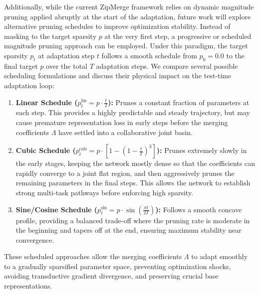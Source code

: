 Additionally, while the current ZipMerge framework relies on dynamic magnitude pruning applied abruptly at the start of the adaptation, future work will explore alternative pruning schedules to improve optimization stability. Instead of masking to the target sparsity $p$ at the very first step, a progressive or scheduled magnitude pruning approach can be employed. Under this paradigm, the target sparsity $p_t$ at adaptation step $t$ follows a smooth schedule from $p_0 = 0.0$ to the final target $p$ over the total $T$ adaptation steps. We compare several possible scheduling formulations and discuss their physical impact on the test-time adaptation loop:
\begin{enumerate}[leftmargin=*]
    \item \textbf{Linear Schedule ($p^{\text{lin}}_t = p \cdot \frac{t}{T}$):} Prunes a constant fraction of parameters at each step. This provides a highly predictable and steady trajectory, but may cause premature representation loss in early steps before the merging coefficients $\Lambda$ have settled into a collaborative joint basin.
    \item \textbf{Cubic Schedule ($p^{\text{cub}}_t = p \cdot \left[1 - \left(1 - \frac{t}{T}\right)^3\right]$):} Prunes extremely slowly in the early stages, keeping the network mostly dense so that the coefficients can rapidly converge to a joint flat region, and then aggressively prunes the remaining parameters in the final steps. This allows the network to establish strong multi-task pathways before enforcing high sparsity.
    \item \textbf{Sine/Cosine Schedule ($p^{\text{sin}}_t = p \cdot \sin\left(\frac{\pi t}{2 T}\right)$):} Follows a smooth concave profile, providing a balanced trade-off where the pruning rate is moderate in the beginning and tapers off at the end, ensuring maximum stability near convergence.
\end{enumerate}
These scheduled approaches allow the merging coefficients $\Lambda$ to adapt smoothly to a gradually sparsified parameter space, preventing optimization shocks, avoiding transductive gradient divergence, and preserving crucial base representations.

